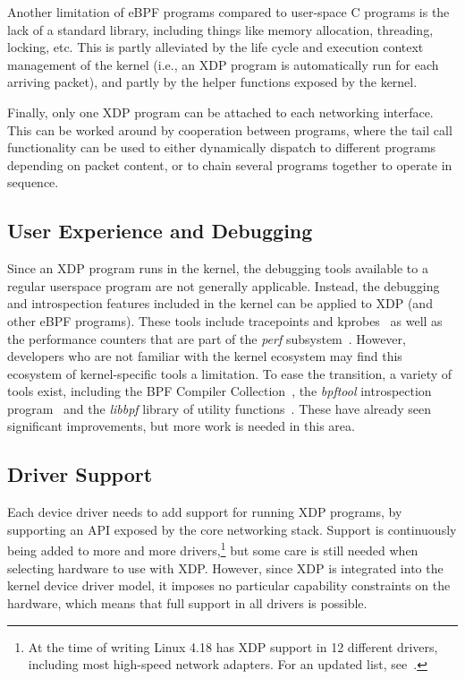 \documentclass[sigconf]{acmart}
\begin{document}
Another limitation of eBPF programs compared to user-space C programs is the
lack of a standard library, including things like memory allocation, threading,
locking, etc. This is partly alleviated by the life cycle and execution context
management of the kernel (i.e., an XDP program is automatically run for each
arriving packet), and partly by the helper functions exposed by the kernel.

Finally, only one XDP program can be attached to each networking interface. This
can be worked around by cooperation between programs, where the tail call
functionality can be used to either dynamically dispatch to different programs
depending on packet content, or to chain several programs together to operate in
sequence.

\subsection{User Experience and Debugging}
\label{sec:user-exper-debugg}
Since an XDP program runs in the kernel, the debugging tools available to a
regular userspace program are not generally applicable. Instead, the debugging
and introspection features included in the kernel can be applied to XDP (and
other eBPF programs). These tools include tracepoints and
kprobes~\cite{kernel-tracing} as well as the performance counters that are part
of the \emph{perf} subsystem~\cite{perf}. However, developers who are not
familiar with the kernel ecosystem may find this ecosystem of kernel-specific
tools a limitation. To ease the transition, a variety of tools exist, including
the BPF Compiler Collection~\cite{bcc}, the \emph{bpftool} introspection
program~\cite{bpftool} and the \emph{libbpf} library of utility
functions~\cite{libbpf}. These have already seen significant improvements, but
more work is needed in this area.


\subsection{Driver Support}
\label{sec:driver-support}
Each device driver needs to add support for running XDP programs, by supporting
an API exposed by the core networking stack. Support is continuously being added
to more and more drivers,\footnote{At the time of writing Linux 4.18 has XDP
  support in 12 different drivers, including most high-speed network adapters.
  For an updated list, see~\cite{cilium-docs}.} but some care is still needed
when selecting hardware to use with XDP. However, since XDP is integrated into
the kernel device driver model, it imposes no particular capability constraints
on the hardware, which means that full support in all drivers is possible.
\end{document}
